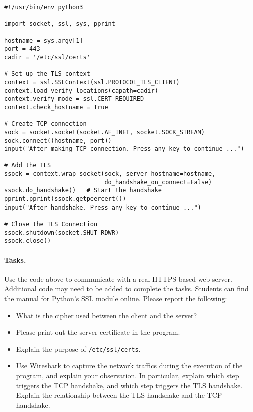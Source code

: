 \begin{lstlisting}[caption={\texttt{handshake.py} (in \texttt{Labsetup/volumes})}, label={tls:handshake}]
#!/usr/bin/env python3

import socket, ssl, sys, pprint

hostname = sys.argv[1]
port = 443
cadir = '/etc/ssl/certs'   

# Set up the TLS context 
context = ssl.SSLContext(ssl.PROTOCOL_TLS_CLIENT) 
context.load_verify_locations(capath=cadir)
context.verify_mode = ssl.CERT_REQUIRED
context.check_hostname = True

# Create TCP connection 
sock = socket.socket(socket.AF_INET, socket.SOCK_STREAM)
sock.connect((hostname, port))
input("After making TCP connection. Press any key to continue ...")

# Add the TLS 
ssock = context.wrap_socket(sock, server_hostname=hostname,
                            do_handshake_on_connect=False)
ssock.do_handshake()   # Start the handshake
pprint.pprint(ssock.getpeercert())
input("After handshake. Press any key to continue ...")

# Close the TLS Connection
ssock.shutdown(socket.SHUT_RDWR)
ssock.close()
\end{lstlisting}
 



\paragraph{Tasks.} Use the code above to communicate with a real HTTPS-based web server.
Additional code may need to be added to complete the tasks. Students can find the manual
for Python's SSL module online.  Please report the following:
\begin{itemize}
\item What is the cipher used between the client and the server? 
\item Please print out the server certificate in the program.
\item Explain the purpose of \texttt{/etc/ssl/certs}.
\item Use Wireshark to capture the network traffics during the 
execution of the program, and explain your observation. In particular,
explain which step triggers the TCP handshake, and which
step triggers the TLS handshake. Explain the relationship between
 the TLS handshake and the TCP handshake. 
\end{itemize}
 


